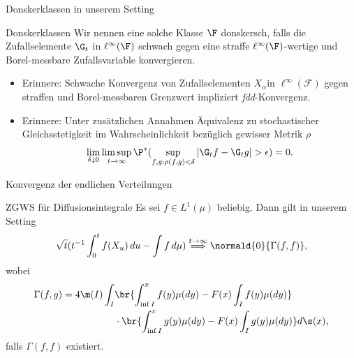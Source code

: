 \begin{frame}{Donskerklassen in unserem Setting}
    \begin{definitionblockname}{Donskerklassen}
        Wir nennen eine solche Klasse $\F$ donskersch, falls die Zufallselemente $\G_t$ in $\ell^\infty(\F)$ schwach gegen eine straffe $\ell^\infty(\F)$-wertige und Borel-messbare Zufallsvariable konvergieren.
    \end{definitionblockname}
    \pause
    \begin{itemize}
        \item Erinnere: Schwache Konvergenz von Zufallselementen $X_\alpha$in $\ell^\infty(\mathcal{F})$ gegen straffen und Borel-messbaren Grenzwert impliziert \textit{fdd}-Konvergenz.
        \item Erinnere: Unter zusätzlichen Annahmen Äquivalenz zu stochastischer Gleichsstetigkeit im Wahrscheinlichkeit bezüglich gewisser Metrik $\rho$ \[
\lim_{\delta\downarrow0} \limsup_{t \to \infty} \P^*(\sup_{f, g: \rho(f,g)< \delta}|\G_tf - \G_tg| > \epsilon) = 0.
        \]
    \end{itemize}
\end{frame}
\begin{frame}{Konvergenz der endlichen Verteilungen}
    \begin{theoremblockname}{ZGWS für Diffusionsintegrale}
        Es sei $f \in L^1(\mu)$ beliebig. Dann gilt in unserem Setting 
        \[
\sqrt{t}(t^{-1}\int_0^tf(X_u)\,du - \int f \,d\mu) \overset{t \to \infty}{\Longrightarrow} \normald{0}{\Gamma(f,f)},
        \] wobei \begin{align*}
\Gamma(f,g) = 4 \m(I) \int_I &\br{\int_{\inf I}^x f(y) \mu(dy) - F(x) \int_I f(y) \mu(dy)} \\
& \cdot \br{\int_{\inf I}^x g(y) \mu(dy) - F(x) \int_I g(y) \mu(dy)} d\s(x),
        \end{align*} falls $\Gamma(f,f)$ existiert.
    \end{theoremblockname}
\end{frame}
